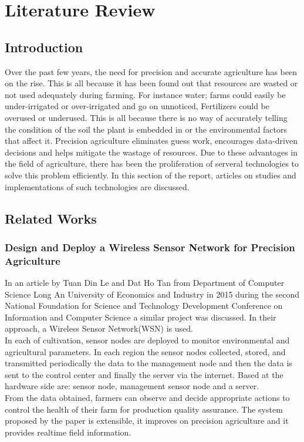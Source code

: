 \documentclass[12pt, a4paper]{article}
\begin{document}
\section{Literature Review}
\subsection{Introduction}
Over the past few years, the need for precision and accurate agriculture has been on the rise. This is all because it has been found out that resources are wasted or not used adequately during farming. For instance water; farms could easily be under-irrigated or over-irrigated and go on unnoticed, Fertilizers could be overused or underused. This is all because there is no way of accurately telling the condition of the soil the plant is embedded in or the environmental factors that affect it. Precision agriculture eliminates guess work, encourages data-driven decisions and helps mitigate the wastage of resources. Due to these advantages in the field of agriculture, there has been the proliferation of serveral technologies to solve this problem efficiently. In this section of the report, articles on studies and implementations of such technologies are discussed.
\subsection{Related Works}
\subsubsection{Design and Deploy a Wireless Sensor Network for Precision Agriculture}
In an article by Tuan Din Le and Dat Ho Tan from Department of Computer Science Long An University of Economics and Industry in 2015 during the second National Foundation for Science and Technology Development Conference on Information and Computer Science a similar project was discussed. In their approach, a Wireless Sensor Network(WSN) is used.\\ 
In each of cultivation, sensor nodes are deployed to monitor environmental and agricultural parameters. In each region the sensor nodes collected, stored, and transmitted periodically the data to the management node and then the data is sent to the control center and finally the server via the internet. Based at the hardware side are: sensor node, management sensor node and a server.\\
From the data obtained, farmers can observe and decide appropriate actions to control the health of their farm for production quality assurance. The system proposed by the paper is extensible, it improves on precision agriculture and it provides realtime field information.
\end{document}
